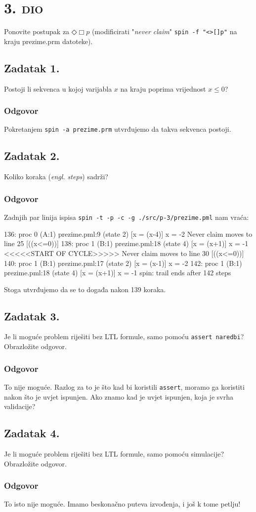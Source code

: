 \documentclass{article}
\newcommand{\sekcija}[1]{\section{\textsc{#1}}}
\newcommand{\dio}[1]{\sekcija{#1. dio}}
\newcommand{\zadatak}[1]{\subsection{Zadatak #1}}
\newcommand{\odgovor}{\subsubsection*{Odgovor}}
\begin{document}
\dio{3}

Ponovite postupak za $\mathbin{\Diamond}\Box p$ (modificirati "\textit{never claim}" \texttt{spin -f "<>[]p"} na kraju prezime.prm datoteke).

\zadatak{1.}

Postoji li sekvenca u kojoj varijabla $x$ na kraju poprima vrijednost $x \leq 0$?

\odgovor

Pokretanjem \texttt{spin -a prezime.prm} utvrđujemo da takva sekvenca postoji.

\zadatak{2.}

Koliko koraka (\textit{engl. steps}) sadrži?

\odgovor

Zadnjih par linija ispisa \texttt{spin -t -p -c -g ./src/p-3/prezime.pml} nam vraća:

\begin{ccode}
136:    proc  0 (A:1) prezime.pml:9 (state 2)    [x = (x-4)]
                x = -2
Never claim moves to line 25    [((x<=0))]
138:    proc  1 (B:1) prezime.pml:18 (state 4)   [x = (x+1)]
                x = -1
  <<<<<START OF CYCLE>>>>>
Never claim moves to line 30    [((x<=0))]
140:    proc  1 (B:1) prezime.pml:17 (state 2)   [x = (x-1)]
                x = -2
142:    proc  1 (B:1) prezime.pml:18 (state 4)   [x = (x+1)]
                x = -1
spin: trail ends after 142 steps
\end{ccode} \newline

\noindent
Stoga utvrđujemo da se to događa nakon 139 koraka.

\zadatak{3.}

Je li moguće problem riješiti bez LTL formule, samo pomoću \texttt{assert naredbi}? Obrazložite odgovor.

\odgovor

To nije moguće. Razlog za to je što kad bi koristili \texttt{assert}, moramo ga koristiti nakon što je uvjet ispunjen. Ako znamo kad je uvjet ispunjen, koja je svrha validacije?

\zadatak{4.}

Je li moguće problem riješiti bez LTL formule, samo pomoću simulacije? Obrazložite odgovor.

\odgovor

To isto nije moguće. Imamo beskonačno puteva izvođenja, i još k tome petlju!

\pagebreak
\end{document}
